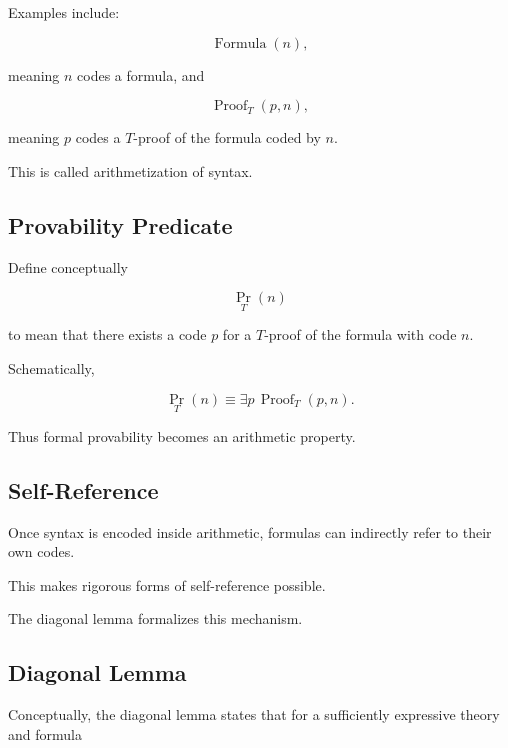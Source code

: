 Examples include:

\[
\boxed{
\operatorname{Formula}(n),
}
\]

meaning \(n\) codes a formula, and

\[
\boxed{
\operatorname{Proof}_T(p,n),
}
\]

meaning \(p\) codes a \(T\)-proof of the formula coded by \(n\).

This is called arithmetization of syntax.

\subsection{Provability Predicate}
\label{subsec:provability-predicate}

Define conceptually

\[
\boxed{
\operatorname{Pr}_T(n)
}
\]

to mean that there exists a code \(p\) for a \(T\)-proof of the formula
with code \(n\).

Schematically,

\[
\boxed{
\operatorname{Pr}_T(n)
\equiv
\exists p\,
\operatorname{Proof}_T(p,n).
}
\]

Thus formal provability becomes an arithmetic property.

\subsection{Self-Reference}
\label{subsec:logical-self-reference}

Once syntax is encoded inside arithmetic, formulas can indirectly refer to
their own codes.

This makes rigorous forms of self-reference possible.

The diagonal lemma formalizes this mechanism.

\subsection{Diagonal Lemma}
\label{subsec:diagonal-lemma}

Conceptually, the diagonal lemma states that for a sufficiently expressive
theory and formula

